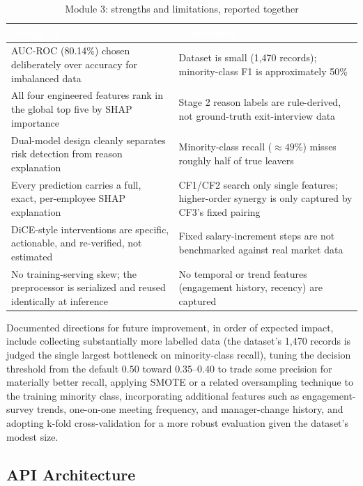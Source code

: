 \documentclass[11pt,a4paper]{article}
\newcommand{\hdrow}{\rowcolor{TPnavy}}
\newcommand{\hdtxt}[1]{\textcolor{white}{\bfseries #1}}
\begin{document}
\begin{table}[H]
\centering
\caption{Module 3: strengths and limitations, reported together}
\label{tab:mod3-strengths}
\small
\begin{tabular}{p{6.6cm}p{6.6cm}}
\toprule
\hdrow \hdtxt{Strengths} & \hdtxt{Limitations} \\
\midrule
AUC-ROC (80.14\%) chosen deliberately over accuracy for imbalanced data & Dataset is small (1{,}470 records); minority-class F1 is approximately 50\% \\
\rowcolor{TPlight}
All four engineered features rank in the global top five by SHAP importance & Stage 2 reason labels are rule-derived, not ground-truth exit-interview data \\
Dual-model design cleanly separates risk detection from reason explanation & Minority-class recall ($\approx 49\%$) misses roughly half of true leavers \\
\rowcolor{TPlight}
Every prediction carries a full, exact, per-employee SHAP explanation & CF1/CF2 search only single features; higher-order synergy is only captured by CF3's fixed pairing \\
DiCE-style interventions are specific, actionable, and re-verified, not estimated & Fixed salary-increment steps are not benchmarked against real market data \\
\rowcolor{TPlight}
No training-serving skew; the preprocessor is serialized and reused identically at inference & No temporal or trend features (engagement history, recency) are captured \\
\bottomrule
\end{tabular}
\end{table}

Documented directions for future improvement, in order of expected impact, include collecting substantially more labelled data (the dataset's 1{,}470 records is judged the single largest bottleneck on minority-class recall), tuning the decision threshold from the default $0.50$ toward $0.35$--$0.40$ to trade some precision for materially better recall, applying SMOTE or a related oversampling technique to the training minority class, incorporating additional features such as engagement-survey trends, one-on-one meeting frequency, and manager-change history, and adopting k-fold cross-validation for a more robust evaluation given the dataset's modest size.

\subsection{API Architecture}
\end{document}
